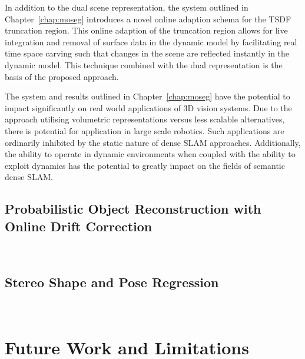 In addition to the dual scene representation, the system outlined in Chapter~\ref{chap:moseg} 
introduces a novel online adaption schema for the TSDF truncation region. This online adaption 
of the truncation region allows for live integration and removal of surface data in the dynamic 
model by facilitating real time space carving such that changes in the scene are reflected 
instantly in the dynamic model. This technique combined with the dual representation is the 
basis of the proposed approach.

The system and results outlined in Chapter~\ref{chap:moseg} have the potential to impact 
significantly on real world applications of 3D vision systems. Due to the approach utilising 
volumetric representations versus less scalable alternatives, there is potential for application 
in large scale robotics. Such applications are ordinarily inhibited by the static nature of 
dense SLAM approaches. Additionally, the ability to operate in dynamic environments when coupled 
with the ability to exploit dynamics has the potential to greatly impact on the fields of semantic 
dense SLAM.

\subsection{Probabilistic Object Reconstruction with Online Drift Correction}
~\label{subsec:discussion_probobj}


\subsection{Stereo Shape and Pose Regression}
~\label{subsec:discussion_spp}

\section{Future Work and Limitations}
~\label{sec:discussion_limitations}

